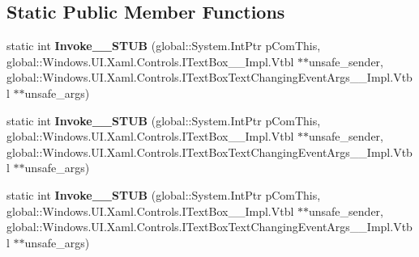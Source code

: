 \subsection*{Static Public Member Functions}
\begin{DoxyCompactItemize}
\item 
\mbox{\label{struct_windows_1_1_foundation_1_1_typed_event_handler___a___windows___u_i___xaml___controls___tef88d8535df07672acd9dfc6e3861f1e1_a44fe6abb99cf85895c5971b4717ed021}} 
static int {\bfseries Invoke\+\_\+\+\_\+\+S\+T\+UB} (global\+::\+System.\+Int\+Ptr p\+Com\+This, global\+::\+Windows.\+U\+I.\+Xaml.\+Controls.\+I\+Text\+Box\+\_\+\+\_\+\+Impl.\+Vtbl $\ast$$\ast$unsafe\+\_\+sender, global\+::\+Windows.\+U\+I.\+Xaml.\+Controls.\+I\+Text\+Box\+Text\+Changing\+Event\+Args\+\_\+\+\_\+\+Impl.\+Vtbl $\ast$$\ast$unsafe\+\_\+args)
\item 
\mbox{\label{struct_windows_1_1_foundation_1_1_typed_event_handler___a___windows___u_i___xaml___controls___tef88d8535df07672acd9dfc6e3861f1e1_a44fe6abb99cf85895c5971b4717ed021}} 
static int {\bfseries Invoke\+\_\+\+\_\+\+S\+T\+UB} (global\+::\+System.\+Int\+Ptr p\+Com\+This, global\+::\+Windows.\+U\+I.\+Xaml.\+Controls.\+I\+Text\+Box\+\_\+\+\_\+\+Impl.\+Vtbl $\ast$$\ast$unsafe\+\_\+sender, global\+::\+Windows.\+U\+I.\+Xaml.\+Controls.\+I\+Text\+Box\+Text\+Changing\+Event\+Args\+\_\+\+\_\+\+Impl.\+Vtbl $\ast$$\ast$unsafe\+\_\+args)
\item 
\mbox{\label{struct_windows_1_1_foundation_1_1_typed_event_handler___a___windows___u_i___xaml___controls___tef88d8535df07672acd9dfc6e3861f1e1_a44fe6abb99cf85895c5971b4717ed021}} 
static int {\bfseries Invoke\+\_\+\+\_\+\+S\+T\+UB} (global\+::\+System.\+Int\+Ptr p\+Com\+This, global\+::\+Windows.\+U\+I.\+Xaml.\+Controls.\+I\+Text\+Box\+\_\+\+\_\+\+Impl.\+Vtbl $\ast$$\ast$unsafe\+\_\+sender, global\+::\+Windows.\+U\+I.\+Xaml.\+Controls.\+I\+Text\+Box\+Text\+Changing\+Event\+Args\+\_\+\+\_\+\+Impl.\+Vtbl $\ast$$\ast$unsafe\+\_\+args)
\item 
\mbox{\label{struct_windows_1_1_foundation_1_1_typed_event_handler___a___windows___u_i___xaml___controls___tef88d8535df07672acd9dfc6e3861f1e1_a44fe6abb99cf85895c5971b4717ed021}} 

\end{DoxyCompactItemize}
